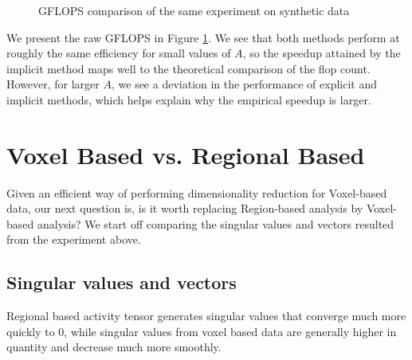 \documentclass{article}[12pt]
\begin{document}
\begin{figure}
\centering
\newcommand{\WW}{60}
\newcommand{\PP}{6}
\newcommand{\AAlim}{2500}
\caption{GFLOPS comparison of the same experiment on synthetic data}
\label{fig:GFLOPS}
\end{figure}


We present the raw GFLOPS in Figure \ref{fig:GFLOPS}.
We see that both methods perform at roughly the same efficiency for small values of $A$, so the speedup attained by the implicit method maps well to the theoretical comparison of the flop count.
However, for larger $A$, we see a deviation in the performance of explicit and implicit methods, which helps explain why the empirical speedup is larger.


\section{Voxel Based vs. Regional Based}

Given an efficient way of performing dimensionality reduction for Voxel-based data, our next question is, is it worth replacing Region-based analysis by Voxel-based analysis? We start off comparing the singular values and vectors resulted from the experiment above.
 
\subsection{Singular values and vectors}
Regional based activity tensor generates singular values that converge much more quickly to 0, while singular values from voxel based data are generally higher in quantity and decrease much more smoothly.  
\end{document}
